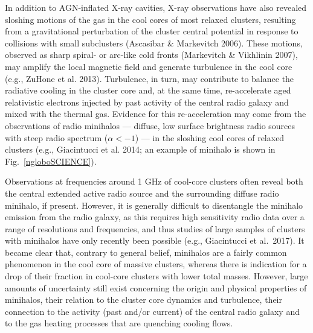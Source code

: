 \documentclass[11pt]{article}
\begin{document}

In addition to AGN-inflated X-ray cavities, X-ray observations have also revealed sloshing motions 
of the gas in the cool cores of most relaxed clusters, resulting from a gravitational perturbation 
of the cluster central potential in response to collisions with small subclusters (Ascasibar \& 
Markevitch 2006). These motions, observed as sharp spiral- or arc-like cold fronts (Markevitch \& Vikhlinin 2007), 
may amplify the local magnetic field and generate turbulence in the cool core (e.g., ZuHone et al. 2013). 
Turbulence, in turn, may contribute to balance the radiative cooling in the cluster core and, 
at the same time, re-accelerate aged relativistic electrons injected by past activity of the central 
radio galaxy and mixed with the thermal gas. Evidence for this re-acceleration may come from the 
observations of radio minihalos --- diffuse, low surface brightness radio sources with steep radio 
spectrum ($\alpha < -1$) --- in the sloshing cool cores of relaxed clusters (e.g., Giacintucci et al. 2014;
an example of minihalo is shown in Fig.~\ref{ngloboSCIENCE}). 

Observations at frequencies around 1 GHz of cool-core clusters often reveal both the central extended active 
radio source and the surrounding diffuse radio minihalo, if present. However, it is generally difficult 
to disentangle the minihalo emission from the radio galaxy, as this requires high sensitivity radio data 
over a range of resolutions and frequencies, and thus studies of large samples of clusters with minihalos have only 
recently been possible (e.g., Giacintucci et al.\ 2017). It became clear that, contrary to general belief, 
minihalos are a fairly common phenomenon in the cool core of massive clusters, whereas there is indication 
for a drop of their fraction in cool-core clusters with lower total masses. However, large amounts of
uncertainty still exist concerning the origin and physical properties of minihalos, their relation to 
the cluster core dynamics and turbulence, their connection to the activity (past and/or current) of 
the central radio galaxy and to the gas heating processes that are quenching cooling flows. 
\end{document}
